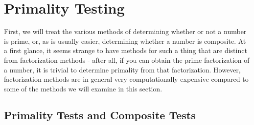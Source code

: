 \documentclass{article}
\begin{document}
\newpage



\section{Primality Testing}

\par First, we will treat the various methods of determining whether or not a number is prime, or, as is usually easier, determining
whether a number is composite. At a first glance, it seems strange to have methods for such a thing that are distinct from factorization methods - after all, if you can obtain the prime factorization of a number, it is trivial to determine primality from that factorization. However, factorization methods are in general very computationally expensive compared to some of the methods we will examine in this section. 


\subsection{ Primality Tests and Composite Tests}
\end{document}
